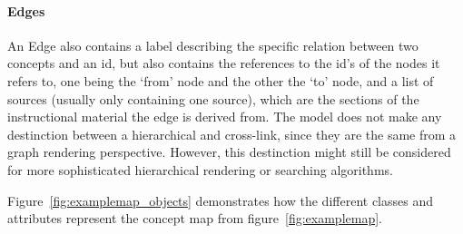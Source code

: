 \paragraph{Edges} An Edge also contains a label describing the specific relation between two concepts and an id, but also contains the references to the id's of the nodes it refers to, one being the `from' node and the other the `to' node, and a list of sources (usually only containing one source), which are the sections of the instructional material the edge is derived from. The model does not make any destinction between a hierarchical and cross-link, since they are the same from a graph rendering perspective. However, this destinction might still be considered for more sophisticated hierarchical rendering or searching algorithms.

Figure~\ref{fig:examplemap_objects} demonstrates how the different classes and attributes represent the concept map from figure~\ref{fig:examplemap}.

